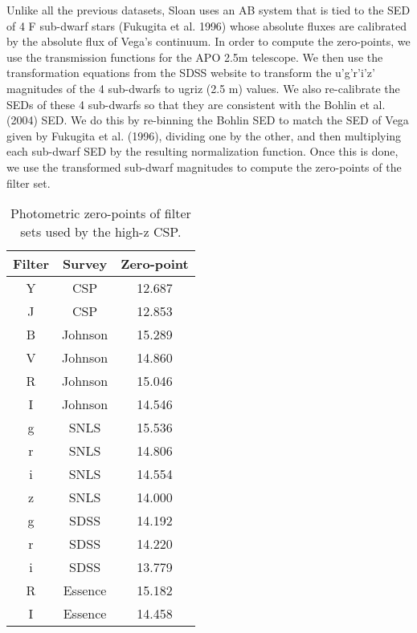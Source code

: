 \documentclass{aastex}
\providecommand{\tabularnewline}{\\}
\begin{document}
Unlike all the previous datasets, Sloan uses an AB system that is
tied to the SED of 4 F sub-dwarf stars (Fukugita et al. 1996) whose
absolute fluxes are calibrated by the absolute flux of Vega's continuum.
In order to compute the zero-points, we use the transmission functions
for the APO 2.5m telescope. We then use the transformation equations
from the SDSS website to transform the u'g'r'i'z' magnitudes of the
4 sub-dwarfs to ugriz (2.5 m) values. We also re-calibrate the SEDs
of these 4 sub-dwarfs so that they are consistent with the Bohlin
et al. (2004) SED. We do this by re-binning the Bohlin SED to match
the SED of Vega given by Fukugita et al. (1996), dividing one by the
other, and then multiplying each sub-dwarf SED by the resulting normalization
function. Once this is done, we use the transformed sub-dwarf magnitudes
to compute the zero-points of the filter set.

%
\begin{table}
\begin{tabular}{|c|c|c|}
\hline 
Filter&
Survey&
Zero-point\tabularnewline
\hline
\hline 
Y&
CSP&
12.687\tabularnewline
\hline 
J&
CSP&
12.853\tabularnewline
\hline 
B&
Johnson&
15.289\tabularnewline
\hline 
V&
Johnson&
14.860\tabularnewline
\hline 
R&
Johnson&
15.046\tabularnewline
\hline 
I&
Johnson&
14.546\tabularnewline
\hline 
g&
SNLS&
15.536\tabularnewline
\hline 
r&
SNLS&
14.806\tabularnewline
\hline 
i&
SNLS&
14.554\tabularnewline
\hline 
z&
SNLS&
14.000\tabularnewline
\hline 
g&
SDSS&
14.192\tabularnewline
\hline 
r&
SDSS&
14.220\tabularnewline
\hline 
i&
SDSS&
13.779\tabularnewline
\hline 
R&
Essence&
15.182\tabularnewline
\hline 
I&
Essence&
14.458\tabularnewline
\hline
\end{tabular}


\caption{Photometric zero-points of filter sets used by the high-z CSP. \label{tab:zeropoints}}
\end{table}
\end{document}
